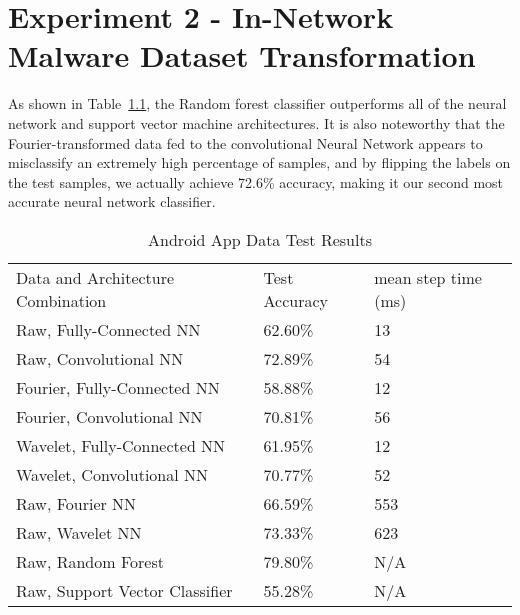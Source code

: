 \chapter{Experiment 2 - In-Network Malware Dataset Transformation}
\label{chap:four}


 \label{malware classifier}
As shown in Table~\ref{Tab:test}, the Random forest classifier outperforms all of the neural network and support vector machine architectures.
It is also noteworthy that the Fourier-transformed data fed to the convolutional Neural Network appears to misclassify an extremely high percentage of samples, and by flipping the labels on the test samples, we actually achieve 72.6\% accuracy, making it our second most accurate neural network classifier.

 
\begin{table}[ht]
\caption{Android App Data Test Results}
\centering
\label{Tab:test}	
\begin{tabular}{lll}
Data and Architecture Combination & Test Accuracy & mean step time (ms) \\
Raw, Fully-Connected NN           & 62.60\%         & 13\\
Raw, Convolutional NN             & 72.89\%         & 54\\
Fourier, Fully-Connected NN       & 58.88\%         & 12\\
Fourier, Convolutional NN         & 70.81\%         & 56\\
Wavelet, Fully-Connected NN       & 61.95\%         & 12\\
Wavelet, Convolutional NN         & 70.77\%         & 52\\
Raw, Fourier NN                   & 66.59\%         & 553\\
Raw, Wavelet NN                   & 73.33\%         & 623\\
Raw, Random Forest                & 79.80\%         & N/A\\
Raw, Support Vector Classifier    & 55.28\%         & N/A           
\end{tabular}
\end{table}
